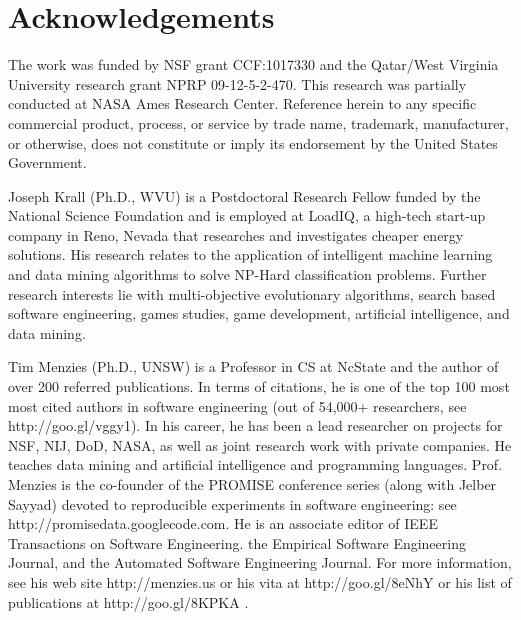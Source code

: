 \documentclass[journal]{IEEEtran}
\begin{document}
\section*{Acknowledgements}

The work was funded by NSF grant CCF:1017330 and the
Qatar/West Virginia University research grant NPRP
09-12-5-2-470.  This research was partially
conducted at NASA Ames Research Center. Reference
herein to any specific commercial product, process,
or service by trade name, trademark, manufacturer,
or otherwise, does not constitute or imply its
endorsement by the United States Government.




\newpage
\begin{IEEEbiography}{Joseph Krall}
(Ph.D., WVU)
is a Postdoctoral Research Fellow funded by the National Science Foundation and is employed  at
LoadIQ, a high-tech start-up company in Reno, Nevada that researches and investigates cheaper energy solutions.
His research relates to the application of
intelligent machine learning and data mining algorithms to solve NP-Hard classification problems.
Further research interests lie with multi-objective evolutionary algorithms, 
search based software engineering, games studies, game development, artificial intelligence, and data mining.
\end{IEEEbiography}

\begin{IEEEbiography}{Tim Menzies} (Ph.D., UNSW)
is a Professor in CS at NcState and  the author of
over 200 referred publications. In terms of citations, he is one of the top 100 most
most cited
authors in  software engineering (out of 54,000+ researchers, see
http://goo.gl/vggy1). In his career, he has been a lead researcher on
projects for NSF, NIJ, DoD, NASA, as well as joint research work with
private companies. He teaches data mining and artificial intelligence
and programming languages. Prof. Menzies is the co-founder of the
PROMISE conference series (along with Jelber Sayyad) devoted to reproducible experiments in
software engineering: see http://promisedata.googlecode.com. He is an
associate editor of IEEE Transactions on Software Engineering. the Empirical Software Engineering Journal, and the
Automated Software Engineering Journal.  For more information, see his web site http://menzies.us
or his vita at http://goo.gl/8eNhY or his list of publications at
http://goo.gl/8KPKA .
\end{IEEEbiography}
\end{document}
